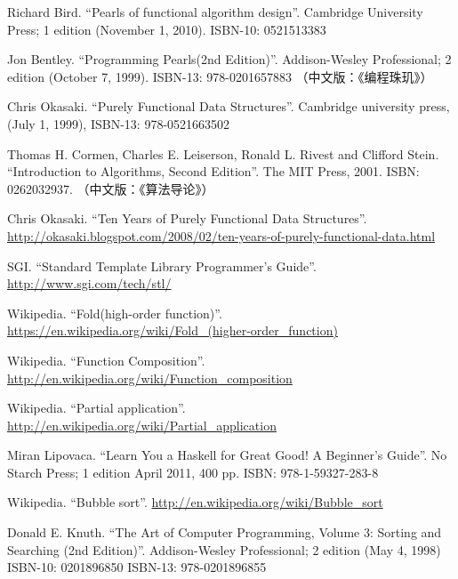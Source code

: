\documentclass[b5paper]{ctexart}
\begin{document}
\begin{thebibliography}{99}


Richard Bird. ``Pearls of functional algorithm design''. Cambridge University Press; 1 edition (November 1, 2010). ISBN-10: 0521513383

Jon Bentley. ``Programming Pearls(2nd Edition)''. Addison-Wesley Professional; 2 edition (October 7, 1999). ISBN-13: 978-0201657883 （中文版：《编程珠玑》）

Chris Okasaki. ``Purely Functional Data Structures''. Cambridge university press, (July 1, 1999), ISBN-13: 978-0521663502

Thomas H. Cormen, Charles E. Leiserson, Ronald L. Rivest and Clifford Stein. ``Introduction to Algorithms, Second Edition''. The MIT Press, 2001. ISBN: 0262032937. （中文版：《算法导论》）


Chris Okasaki. ``Ten Years of Purely Functional Data Structures''. \url{http://okasaki.blogspot.com/2008/02/ten-years-of-purely-functional-data.html}

SGI. ``Standard Template Library Programmer's Guide''. \url{http://www.sgi.com/tech/stl/}


Wikipedia. ``Fold(high-order function)''. \url{https://en.wikipedia.org/wiki/Fold_(higher-order_function)}

Wikipedia. ``Function Composition''. \url{http://en.wikipedia.org/wiki/Function_composition}

Wikipedia. ``Partial application''. \url{http://en.wikipedia.org/wiki/Partial_application}

Miran Lipovaca. ``Learn You a Haskell for Great Good! A Beginner's Guide''. No Starch Press; 1 edition April 2011, 400 pp. ISBN: 978-1-59327-283-8

Wikipedia. ``Bubble sort''. \url{http://en.wikipedia.org/wiki/Bubble_sort}

Donald E. Knuth. ``The Art of Computer Programming, Volume 3: Sorting and Searching (2nd Edition)''. Addison-Wesley Professional; 2 edition (May 4, 1998) ISBN-10: 0201896850 ISBN-13: 978-0201896855


\end{thebibliography}
\end{document}
